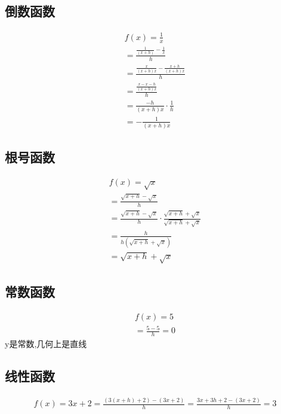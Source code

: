 \documentclass[12pt]{article}
\begin{document}
\subsection*{倒数函数}
\begin{align}
f(x) = \frac{1}{x} \\
= \frac{\frac{1}{(x+h)} -\frac{1}{x}}{h} \\
= \frac{\frac{x}{(x+h)x}-\frac{x+h}{(x+h)x}}{h} \\
= \frac{\frac{x-x-h}{(x+h)x}}{h} \\
= \frac{-h}{(x+h)x} \cdot \frac{1}{h} \\
= -\frac{1}{(x+h)x}
\end{align}

\subsection*{根号函数}
\begin{align}
f(x) = \sqrt{x} \\
= \frac{\sqrt{x+h}-\sqrt{x}}{h}\\
= \frac{\sqrt{x+h}-\sqrt{x}}{h} \cdot  \frac{\sqrt{x+h}+\sqrt{x}}{\sqrt{x+h}+\sqrt{x}} \\ 
= \frac{h}{h(\sqrt{x+h}+\sqrt{x})} \\
= \sqrt{x+h}+\sqrt{x} 
\end{align}


\subsection*{常数函数}
\begin{align}
f(x) = 5 \\
= \frac{5-5}{h}
= 0
\end{align}
y是常数,几何上是直线

\subsection*{线性函数}
\begin{align}
f(x) = 3x + 2
= \frac{(3(x+h) + 2) -(3x +2)}{h}
= \frac{3x + 3h +2 -(3x +2)}{h}
= 3 
\end{align}
\end{document}
